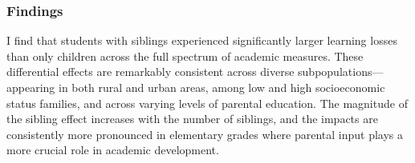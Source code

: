 


\subsubsection{Findings}

I find that students with siblings experienced significantly larger learning losses than only children across the full spectrum of academic measures. These differential effects are remarkably consistent across diverse subpopulations—appearing in both rural and urban areas, among low and high socioeconomic status families, and across varying levels of parental education. The magnitude of the sibling effect increases with the number of siblings, and the impacts are consistently more pronounced in elementary grades where parental input plays a more crucial role in academic development.

